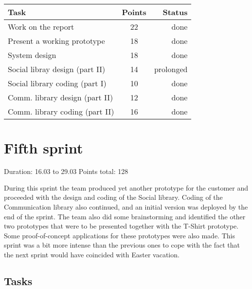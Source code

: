 \begin{table}[ht!]
\begin{tabular}{ | l | c | r | }

\hline
\textbf{Task} & \textbf{Points} & \textbf{Status} \\
\hline

Work on the report				& 22 & done \\ 
\hline
Present a working prototype		& 18 & done \\
\hline
System design					& 18 & done \\
\hline
Social libray design (part II)	& 14 & prolonged \\
\hline
Social library coding (part I)	& 10 & done \\
\hline
Comm. library design (part II)	& 12 & done \\
\hline
Comm. library coding (part II)	& 16 & done \\
\hline

\end{tabular}
\end{table}

\newpage

\section{Fifth sprint}

Duration: 16.03 to 29.03
Points total: 128

During this sprint the team produced yet another prototype for the customer
and proceeded with the design and coding of the Social library.
Coding of the Communication library also continued, and an initial version
was deployed by the end of the sprint. The team also did some brainstorming
and identified the other two prototypes that were to be presented together with
the T-Shirt prototype. Some proof-of-concept applications for these
prototypes were also made. This sprint was a bit more intense than the previous
ones to cope with the fact that the next sprint would have coincided with Easter vacation.

\subsection{Tasks}


